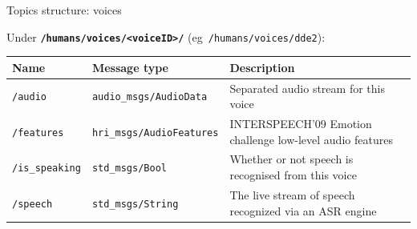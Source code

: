 \documentclass[xcolor=table]{beamer}
\begin{document}
\begin{frame}{Topics structure: voices}

    Under \textbf{\texttt{/humans/voices/<voiceID>/}} (eg~\texttt{/humans/voices/dde2}):

    \scriptsize
    \begin{tabular}{@{}llp{4cm}@{}}
        \toprule
        \textbf{Name} & \textbf{Message type}         & \textbf{Description}                                                \\ \midrule
        \texttt{/audio       } & \texttt{audio\_msgs/AudioData  } & Separated audio stream for this voice                     \\
        \texttt{/features    } & \texttt{hri\_msgs/AudioFeatures} & INTERSPEECH’09 Emotion challenge low-level audio features \\
        \texttt{/is\_speaking} & \texttt{std\_msgs/Bool         } & Whether or not speech is recognised from this voice       \\
        \texttt{/speech      } & \texttt{std\_msgs/String       } & The live stream of speech recognized via an ASR engine \\
        \bottomrule               
\end{tabular}
    
\end{frame}
\end{document}
